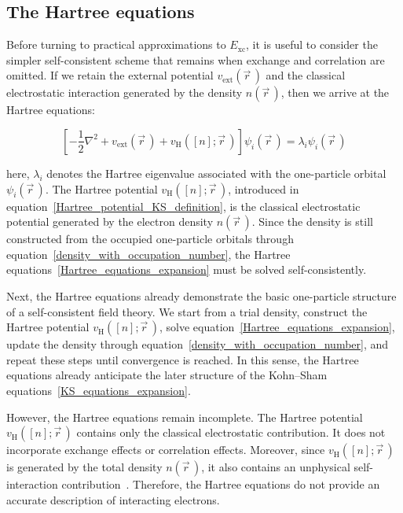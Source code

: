 \FloatBarrier
\subsection{The Hartree equations}

Before turning to practical approximations to $E_\mathrm{xc}$, it is useful to consider the simpler self-consistent scheme that remains when exchange and correlation are omitted. If we retain the external potential $v_\mathrm{ext}(\vec{r}\,)$ and the classical electrostatic interaction generated by the density $n(\vec{r}\,)$, then we arrive at the Hartree equations:

\begin{equation}
    \left[-\frac{1}{2}\nabla^2
        + v_\mathrm{ext}(\vec{r}\,)
        + v_\mathrm{H}([n];\vec{r}\,)\right]
    \psi_i(\vec{r}\,)
    = \lambda_i \psi_i(\vec{r}\,)
\label{Hartree_equations_expansion}
\end{equation}

here, $\lambda_i$ denotes the Hartree eigenvalue associated with the one-particle orbital $\psi_i(\vec{r}\,)$.
The Hartree potential $v_\mathrm{H}([n];\vec{r}\,)$, introduced in equation~\eqref{Hartree_potential_KS_definition}, is the classical electrostatic potential generated by the electron density $n(\vec{r}\,)$.
Since the density is still constructed from the occupied one-particle orbitals through equation~\eqref{density_with_occupation_number},
the Hartree equations~\eqref{Hartree_equations_expansion} must be solved self-consistently.

Next, the Hartree equations already demonstrate the basic one-particle structure of a self-consistent field theory.
We start from a trial density,
construct the Hartree potential $v_\mathrm{H}([n];\vec{r}\,)$,
solve equation~\eqref{Hartree_equations_expansion},
update the density through equation~\eqref{density_with_occupation_number},
and repeat these steps until convergence is reached.
In this sense, the Hartree equations already anticipate the later structure of the Kohn--Sham equations~\eqref{KS_equations_expansion}.

However, the Hartree equations remain incomplete.
The Hartree potential $v_\mathrm{H}([n];\vec{r}\,)$ contains only the classical electrostatic contribution.
It does not incorporate exchange effects or correlation effects.
Moreover, since $v_\mathrm{H}([n];\vec{r}\,)$ is generated by the total density $n(\vec{r}\,)$,
it also contains an unphysical self-interaction contribution~\cite{perdew1981self}.
Therefore, the Hartree equations do not provide an accurate description of interacting electrons.

